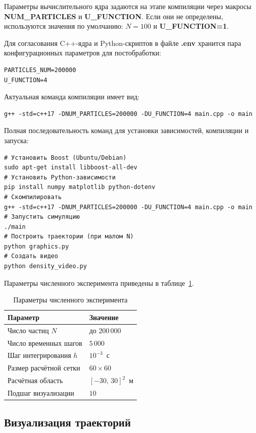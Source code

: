\documentclass[14pt,a4paper]{extarticle}
\numberwithin{figure}{section}
\numberwithin{table}{section}
\begin{document}
Параметры вычислительного ядра задаются на этапе компиляции через макросы
\textbf{NUM\_PARTICLES} и \textbf{U\_FUNCTION}. Если они не определены,
используются значения по умолчанию: $N=100$ и \textbf{U\_FUNCTION=1}.

Для согласования C++-ядра и Python-скриптов в файле \textbf{.env} хранится
пара конфигурационных параметров для постобработки:

\begin{verbatim}
PARTICLES_NUM=200000
U_FUNCTION=4
\end{verbatim}

Актуальная команда компиляции имеет вид:
\begin{verbatim}
g++ -std=c++17 -DNUM_PARTICLES=200000 -DU_FUNCTION=4 main.cpp -o main
\end{verbatim}

Полная последовательность команд для установки зависимостей, компиляции и запуска:
\begin{verbatim}
# Установить Boost (Ubuntu/Debian)
sudo apt-get install libboost-all-dev
# Установить Python-зависимости
pip install numpy matplotlib python-dotenv
# Скомпилировать
g++ -std=c++17 -DNUM_PARTICLES=200000 -DU_FUNCTION=4 main.cpp -o main
# Запустить симуляцию
./main
# Построить траектории (при малом N)
python graphics.py
# Создать видео
python density_video.py
\end{verbatim}

Параметры численного эксперимента приведены в таблице~\ref{tab:params}.

\begin{table}[h]
\centering
\caption{Параметры численного эксперимента}
\label{tab:params}
\begin{tabular}{|l|l|}
\hline
\textbf{Параметр}              & \textbf{Значение} \\
\hline
Число частиц $N$               & до $200\,000$ \\
Число временных шагов          & $5\,000$ \\
Шаг интегрирования $h$         & $10^{-3}$~с \\
Размер расчётной сетки         & $60 \times 60$ \\
Расчётная область              & $[-30,\, 30]^2$~м \\
Подшаг визуализации            & $10$ \\
\hline
\end{tabular}
\end{table}

\subsection{Визуализация траекторий}
\end{document}
